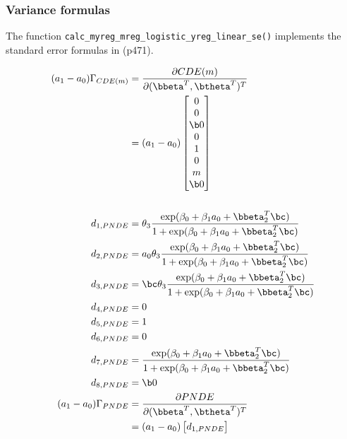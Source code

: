 \documentclass[dvipdfmx,10pt]{article}
\begin{document}
\subsubsection{Variance formulas}
\label{sec:orgf057afa}
The function \texttt{calc\_myreg\_mreg\_logistic\_yreg\_linear\_se()} implements the standard error formulas in \cite{vanderweeleExplanationCausalInference2015} (p471).

\begin{align*}
  (a_{1}-a_{0})\Gamma_{CDE(m)}
  &= \frac{\partial CDE(m)}{\partial (\bbeta^{T},\btheta^{T})^{T}}\\
  &= (a_{1}-a_{0})
    \begin{bmatrix}
      0\\
      0\\
      \b0\\
      0\\
      1\\
      0\\
      m\\
      \b0\\
    \end{bmatrix}\\
  \\
  d_{1,PNDE} &= \theta_{3} \frac
               {\exp(\beta_{0} + \beta_{1}a_{0} + \bbeta_{2}^{T}\bc)}
               {1 + \exp(\beta_{0} + \beta_{1}a_{0} + \bbeta_{2}^{T}\bc)}\\
  d_{2,PNDE} &= a_{0} \theta_{3} \frac
               {\exp(\beta_{0} + \beta_{1}a_{0} + \bbeta_{2}^{T}\bc)}
               {1 + \exp(\beta_{0} + \beta_{1}a_{0} + \bbeta_{2}^{T}\bc)}\\
  d_{3,PNDE} &= \bc \theta_{3} \frac
               {\exp(\beta_{0} + \beta_{1}a_{0} + \bbeta_{2}^{T}\bc)}
               {1 + \exp(\beta_{0} + \beta_{1}a_{0} + \bbeta_{2}^{T}\bc)}\\
  d_{4,PNDE} &= 0\\
  d_{5,PNDE} &= 1\\
  d_{6,PNDE} &= 0\\
  d_{7,PNDE} &= \frac
               {\exp(\beta_{0} + \beta_{1}a_{0} + \bbeta_{2}^{T}\bc)}
               {1 + \exp(\beta_{0} + \beta_{1}a_{0} + \bbeta_{2}^{T}\bc)}\\
  d_{8,PNDE} &= \b0\\
  (a_{1}-a_{0})\Gamma_{PNDE}
  &= \frac{\partial PNDE}{\partial (\bbeta^{T},\btheta^{T})^{T}}\\
  &= (a_{1}-a_{0})
    \begin{bmatrix}
      d_{1,PNDE}\\

\end{bmatrix}
\end{align*}
\end{document}
